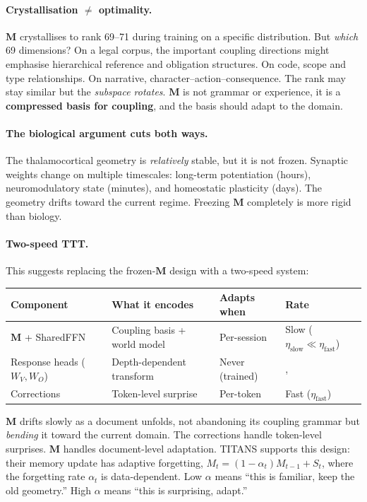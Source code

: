 \documentclass[11pt, a4paper]{article}
\newcommand{\M}{\mathbf{M}}
\theoremstyle{plain}
\theoremstyle{definition}
\theoremstyle{remark}
\begin{document}
\paragraph{Crystallisation $\neq$ optimality.}
$\M$ crystallises to rank 69--71 during training on a specific distribution.
But \emph{which} 69 dimensions?
On a legal corpus, the important coupling directions might emphasise hierarchical reference and obligation structures.
On code, scope and type relationships.
On narrative, character--action--consequence.
The rank may stay similar but the \emph{subspace rotates}.
$\M$ is not grammar or experience, it is a \textbf{compressed basis for coupling}, and the basis should adapt to the domain.

\paragraph{The biological argument cuts both ways.}
The thalamocortical geometry is \emph{relatively} stable, but it is not frozen.
Synaptic weights change on multiple timescales: long-term potentiation (hours), neuromodulatory state (minutes), and homeostatic plasticity (days).
The geometry drifts toward the current regime.
Freezing $\M$ completely is more rigid than biology.

\paragraph{Two-speed TTT.}
This suggests replacing the frozen-$\M$ design with a two-speed system:

\begin{center}\small
\begin{tabular}{llll}
\toprule
\textbf{Component} & \textbf{What it encodes} & \textbf{Adapts when} & \textbf{Rate} \\
\midrule
$\M$ + SharedFFN & Coupling basis + world model & Per-session & Slow ($\eta_{\mathrm{slow}} \ll \eta_{\mathrm{fast}}$) \\
Response heads ($W_V, W_O$) & Depth-dependent transform & Never (trained) & ,  \\
Corrections & Token-level surprise & Per-token & Fast ($\eta_{\mathrm{fast}}$) \\
\bottomrule
\end{tabular}
\end{center}

$\M$ drifts slowly as a document unfolds, not abandoning its coupling grammar but \emph{bending} it toward the current domain.
The corrections handle token-level surprises.
$\M$ handles document-level adaptation.
TITANS supports this design: their memory update has adaptive forgetting, $M_t = (1 - \alpha_t) M_{t-1} + S_t$, where the forgetting rate $\alpha_t$ is data-dependent.
Low $\alpha$ means ``this is familiar, keep the old geometry.''
High $\alpha$ means ``this is surprising, adapt.''
\end{document}
